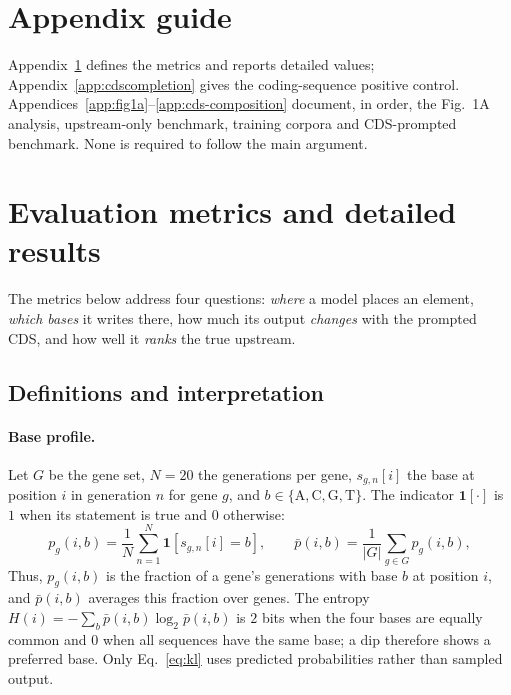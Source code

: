 \documentclass{article}
\begin{document}
\appendix
{}
\section*{Appendix guide}
Appendix~\ref{app:metrics} defines the metrics and reports detailed values;
Appendix~\ref{app:cdscompletion} gives the coding-sequence positive control.
Appendices~\ref{app:fig1a}--\ref{app:cds-composition} document, in order, the
Fig.~1A analysis, upstream-only benchmark, training corpora and CDS-prompted
benchmark. None is required to follow the main argument.

\section{Evaluation metrics and detailed results}
\label{app:metrics}

The metrics below address four questions: \emph{where} a model places an element,
\emph{which bases} it writes there, how much its output \emph{changes} with the
prompted CDS, and how well it \emph{ranks} the true upstream.

\subsection{Definitions and interpretation}

\paragraph{Base profile.} Let $G$ be the gene set, $N=20$ the generations per
gene, $s_{g,n}[i]$ the base at position $i$ in generation $n$ for gene $g$, and
$b\in\{\mathrm{A,C,G,T}\}$. The indicator $\mathbf{1}[\cdot]$ is $1$ when its
statement is true and $0$ otherwise:
\begin{equation}
p_g(i,b)=\frac{1}{N}\sum_{n=1}^{N}\mathbf{1}\!\left[s_{g,n}[i]=b\right],
\qquad
\bar p(i,b)=\frac{1}{|G|}\sum_{g\in G} p_g(i,b),
\label{eq:profile}
\end{equation}
Thus, $p_g(i,b)$ is the fraction of a gene's generations with base $b$ at
position $i$, and $\bar p(i,b)$ averages this fraction over genes. The entropy
$H(i)=-\sum_b \bar p(i,b)\log_2 \bar p(i,b)$ is $2$ bits when the four bases are
equally common and $0$ when all sequences have the same base; a dip therefore
shows a preferred base. Only Eq.~\ref{eq:kl} uses predicted probabilities rather
than sampled output.
\end{document}
